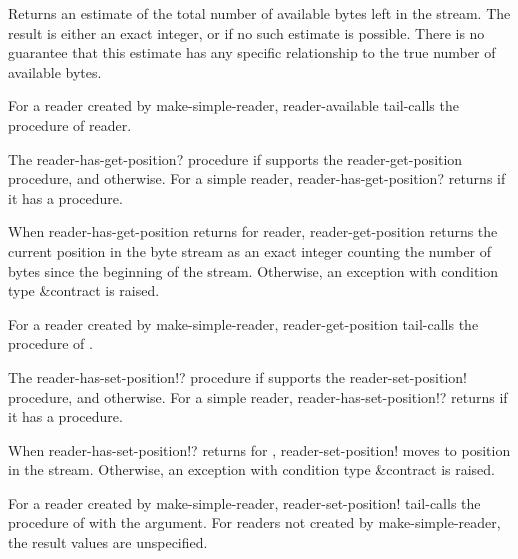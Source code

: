 \begin{entry}{%
}
   
Returns an estimate of the total number of available bytes left in the
stream. The result is either an exact integer, or \schfalse{} if no such
estimate is possible. There is no guarantee that this estimate has
any specific relationship to the true number of available bytes.
   
For a reader created by {\cf make-simple-reader}, {\cf reader-available}
tail-calls the  procedure of reader.
\end{entry}   

\begin{entry}{%
}

The {\cf reader-has-get-position?} procedure \schtrue{} if 
supports the {\cf reader-get-position} procedure, and \schfalse{}
otherwise.  For a simple reader, {\cf reader-has-get-position?}
returns \schtrue{} if it has a  procedure.
   
When {\cf reader-has-get-position} returns \schtrue{} for reader, {\cf
  reader-get-position} returns the current position in the byte stream
as an exact integer counting the number of bytes since the beginning
of the stream.  Otherwise, an exception with condition type
{\cf\&contract} is raised.

For a reader created by {\cf make-simple-reader}, {\cf
  reader-get-position} tail-calls the  procedure of
.
\end{entry}

\begin{entry}{%
}


The {\cf reader-has-set-position!?} procedure \schtrue{} if 
supports the {\cf reader-set-position!} procedure, and \schfalse{}
otherwise.  For a simple reader, {\cf reader-has-set-position!?}
returns \schtrue{} if it has a  procedure.

When {\cf reader-has-set-position!?} returns \schtrue{} for
, {\cf reader-set-position!}  moves to position 
in the stream.  Otherwise, an {\cf exception} with condition type
{\cf\&contract} is raised.

For a reader created by {\cf make-simple-reader}, {\cf
  reader-set-position!} tail-calls the  procedure
of  with the  argument.  For readers not created
by {\cf make-simple-reader}, the result values are unspecified.
\end{entry}

